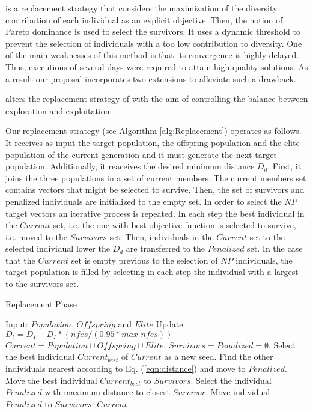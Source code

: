 \RMDDC{} is a replacement strategy that considers the maximization of the diversity 
contribution of each individual as an explicit objective.
%
Then, the notion of Pareto dominance is used to select the survivors.
%
It uses a dynamic threshold to prevent the selection of individuals with a too low contribution to diversity.
%
One of the main weaknesses of this method is that its convergence is highly delayed.
%
Thus, executions of several days were required to attain high-quality solutions.
%
As a result our proposal incorporates two extensions to alleviate such a drawback.

\DEEDM{} alters the replacement strategy of \DE{} with the aim of controlling the 
balance between exploration and exploitation.
%
%

Our replacement strategy (see Algorithm \ref{alg:Replacement}) operates as follows.
%
It receives as input the target population, the offspring population and the elite population of the current generation and
it must generate the next target population.
%
Additionally, it reaceives the desired minimum distance $D_d$.
%
First, it joins the three populations in a set of current members.
%
The current members set contains vectors that might be selected to survive.
%
Then, the set of survivors and penalized individuals are initialized to the empty set.
%
In order to select the $NP$ target vectors an iterative process is repeated.
%
In each step the best individual in the $Current$ set, i.e. the one with best objective function is selected
to survive, i.e. moved to the $Survivors$ set.
%
Then, individuals in the $Current$ set to the selected individual lower the $D_d$ are transferred to the
$Penalized$ set.
%
In the case that the $Current$ set is empty previous to the selection of $NP$ individuals, the target
population is filled by selecting in each step the individual with a largest \DCN{} to the survivors set.


\begin{algorithm}[H]
  \scriptsize
	\caption{Replacement Phase} \label{alg:Replacement}
	\begin{algorithmic}[1]
	\STATE Input: $Population$, $Offspring$ and $Elite$
	\STATE Update $D_t = D_I - D_I *(nfes/(0.95*max\_nfes)) $ 
	\STATE $Current = Population \cup Offspring \cup Elite$.
	\STATE $Survivors = Penalized = \emptyset$.
	   \STATE Select the best individual $Current_{best}$ of $Current$ as a new seed.
	   \STATE Find the other individuals nearest according to Eq. (\ref{eqn:distance}) and move to $Penalized$.
	   \STATE Move the best individual $Current_{best}$ to $Survivors$.
	\ENDWHILE
	   \STATE Select the individual $Penalized$ with maximum distance to closest $Survivor$.
	   \STATE Move individual $Penalized$ to $Survivors$.
	\ENDWHILE
       \RETURN $Current$
\end{algorithmic}
\end{algorithm}


